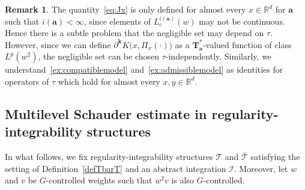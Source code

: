 \documentclass[10pt]{amsart}
\theoremstyle{definition}
\newtheorem{rema}[theo]{Remark}
\numberwithin{equation}{section}
\newcommand{\bbR}{\mathbb{R}}
\newcommand{\bfa}{\mathbf{a}}
\newcommand{\bfT}{\mathbf{T}}
\newcommand{\bfk}{\mathbf{k}}
\newcommand{\mcI}{\mathcal{I}}
\newcommand{\scT}{\mathscr{T}}
\begin{document}
\begin{rema}
The quantity~\eqref{eq:Jx} is only defined for almost every $x\in\bbR^d$ for $\bfa$ such that $i(\bfa)<\infty$, since elements of $L_c^{i(\bfa)}(w)$ may not be continuous. Hence there is a subtle problem that the negligible set may depend on $\tau$. However, since we can define $\partial^{\bfk}K\big(x,\Pi_x(\cdot)\big)$ as a $\bfT_\bfa^*$-valued function of class $L^p(w^2)$, the negligible set can be chosen $\tau$-independently. Similarly, we understand~\eqref{ex:compatiblemodel} and~\eqref{ex:admissiblemodel} as identities for operators of $\tau$ which hold for almost every $x,y\in\bbR^d$.
\end{rema}


\subsection{Multilevel Schauder estimate in regularity-integrability structures}

In what follows, we fix regularity-integrability structures $\scT$ and $\bar{\scT}$ satisfying the setting of Definition~\ref{defTbarT} and an abstract integration $\mcI$. Moreover, let $w$ and $v$ be $G$-controlled weights such that $w^2v$ is also $G$-controlled.
\end{document}
